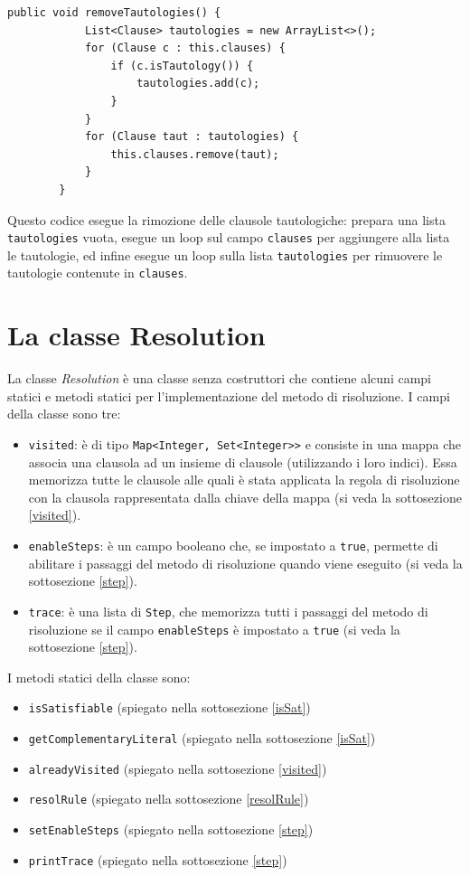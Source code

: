 \documentclass[a4paper,12pt]{report}
\begin{document}
\begin{minipage}{\linewidth}
    \small
    \begin{lstlisting}[caption={Metodo ``removeTautologies'' della classe ClauseSet}, label={remtaut}]
        public void removeTautologies() {
            List<Clause> tautologies = new ArrayList<>();
            for (Clause c : this.clauses) {
                if (c.isTautology()) {
                    tautologies.add(c);
                }
            }
            for (Clause taut : tautologies) {
                this.clauses.remove(taut);
            }
        }
    \end{lstlisting}
\end{minipage}
Questo codice esegue la rimozione delle clausole tautologiche: prepara una lista \texttt{tautologies} vuota, esegue un loop sul campo \texttt{clauses} per aggiungere alla lista le tautologie, ed infine esegue un loop sulla lista \texttt{tautologies} per rimuovere le tautologie contenute in \texttt{clauses}.

\section{La classe Resolution}
La classe \emph{Resolution} è una classe senza costruttori che contiene alcuni campi statici e metodi statici per l'implementazione del metodo di risoluzione. I campi della classe sono tre:
\begin{itemize}
    \item \texttt{visited}: è di tipo \texttt{Map<Integer, Set<Integer>>} e consiste in una mappa che associa una clausola ad un insieme di clausole (utilizzando i loro indici). Essa memorizza tutte le clausole alle quali è stata applicata la regola di risoluzione con la clausola rappresentata dalla chiave della mappa (si veda la sottosezione \ref{visited}).
    \item \texttt{enableSteps}: è un campo booleano che, se impostato a \texttt{true}, permette di abilitare i passaggi del metodo di risoluzione quando viene eseguito (si veda la sottosezione \ref{step}).
    \item \texttt{trace}: è una lista di \texttt{Step}, che memorizza tutti i passaggi del metodo di risoluzione se il campo \texttt{enableSteps} è impostato a \texttt{true} (si veda la sottosezione \ref{step}).
\end{itemize}

I metodi statici della classe sono:
\begin{itemize}
    \item \texttt{isSatisfiable} (spiegato nella sottosezione \ref{isSat})
    \item \texttt{getComplementaryLiteral} (spiegato nella sottosezione \ref{isSat})
    \item \texttt{alreadyVisited} (spiegato nella sottosezione \ref{visited})
    \item \texttt{resolRule} (spiegato nella sottosezione \ref{resolRule})
    \item \texttt{setEnableSteps} (spiegato nella sottosezione \ref{step})
    \item \texttt{printTrace} (spiegato nella sottosezione \ref{step})
\end{itemize}
\end{document}

